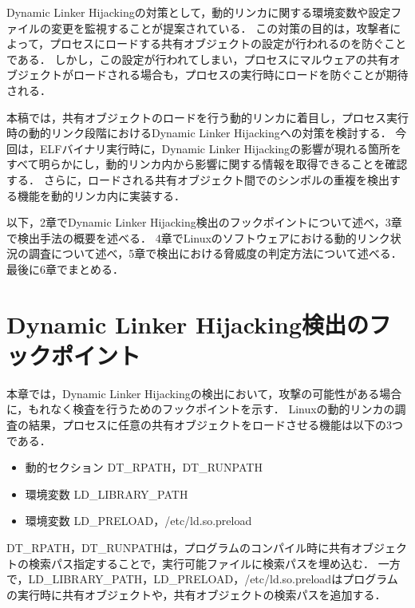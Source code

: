 \documentclass[submit,techreq,noauthor]{eco}	%
\begin{document}
  Dynamic Linker Hijackingの対策として，動的リンカに関する環境変数や設定ファイルの変更を監視することが提案されている\cite{MITRE-ATT&CK}．
  この対策の目的は，攻撃者によって，プロセスにロードする共有オブジェクトの設定が行われるのを防ぐことである．
  しかし，この設定が行われてしまい，プロセスにマルウェアの共有オブジェクトがロードされる場合も，プロセスの実行時にロードを防ぐことが期待される．

  本稿では，共有オブジェクトのロードを行う動的リンカに着目し，プロセス実行時の動的リンク段階におけるDynamic Linker Hijackingへの対策を検討する．
  今回は，ELFバイナリ実行時に，Dynamic Linker Hijackingの影響が現れる箇所をすべて明らかにし，動的リンカ内から影響に関する情報を取得できることを確認する．
  さらに，ロードされる共有オブジェクト間でのシンボルの重複を検出する機能を動的リンカ内に実装する．

  以下，2章でDynamic Linker Hijacking検出のフックポイントについて述べ，3章で検出手法の概要を述べる．
  4章でLinuxのソフトウェアにおける動的リンク状況の調査について述べ，5章で検出における脅威度の判定方法について述べる．最後に6章でまとめる．\\


\section{Dynamic Linker Hijacking検出のフックポイント}
本章では，Dynamic Linker Hijackingの検出において，攻撃の可能性がある場合に，もれなく検査を行うためのフックポイントを示す．
Linuxの動的リンカの調査の結果，プロセスに任意の共有オブジェクトをロードさせる機能は以下の3つである．
\begin{itemize}
  \item 動的セクション DT\_RPATH，DT\_RUNPATH
  \item 環境変数 LD\_LIBRARY\_PATH
  \item 環境変数 LD\_PRELOAD，/etc/ld.so.preload
 \end{itemize}

 DT\_RPATH，DT\_RUNPATHは，プログラムのコンパイル時に共有オブジェクトの検索パス指定することで，実行可能ファイルに検索パスを埋め込む．
 一方で，LD\_LIBRARY\_PATH，LD\_PRELOAD，/etc/ld.so.preloadはプログラムの実行時に共有オブジェクトや，共有オブジェクトの検索パスを追加する．
\end{document}
